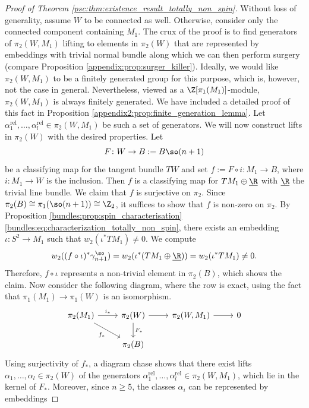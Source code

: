 \begin{proof}[Proof of Theorem \ref{psc:thm:existence_result_totally_non_spin}]
Without loss of generality, assume $W$ to be connected as well. Otherwise, consider only the connected component containing $M_1$. The crux of the proof is to find generators of $\pi_2(W,M_1)$ lifting to elements in $\pi_2(W)$ that are represented by embeddings with trivial normal bundle along which we can then perform surgery (compare Proposition \ref{appendix:prop:surger_killer}). Ideally, we would like $\pi_2(W,M_1)$ to be a finitely generated group for this purpose, which is, however, not the case in general. Nevertheless, viewed as a $\Z[\pi_1(M_1)]$-module, $\pi_2(W,M_1)$ is always finitely generated. We have included a detailed proof of this fact in Proposition \ref{appendix2:prop:finite_generation_lemma}. Let $\alpha_1^\mathrm{rel},\ldots, \alpha_l^\mathrm{rel} \in \pi_2(W,M_1)$ be such a set of generators. We will now construct lifts in $\pi_2(W)$ with the desired properties. 
Let
\[
F \colon W \to B := B\so(n+1)
\]
be a classifying map for the tangent bundle $TW$ and set $f := F \circ i \colon M_1 \to B$, where $i \colon M_1 \to W$ is the inclusion. Then $f$ is a classifying map for $TM_1 \oplus \underline{\R}$ with $\underline{\R}$ the trivial line bundle. We claim that $f$ is surjective on $\pi_2$. Since $\pi_2(B) \cong \pi_1(\so(n+1)) \cong \Z_2$, it suffices to show that $f$ is non-zero on $\pi_2$. By Proposition \ref{bundles:prop:spin_characterisation} \ref{bundles:eq:characterization_totally_non_spin}, there exists an embedding $\iota \colon S^2 \to M_1$ such that $w_2(\iota^\ast TM_1) \neq 0$. We compute 
\[
w_2((f \circ \iota)^\ast \gamma_{n+1}^\so) = w_2(\iota^\ast (TM_1 \oplus \underline{\R})) = w_2(\iota^\ast TM_1) \neq 0.
\]
Therefore, $f \circ \iota$ represents a non-trivial element in $\pi_2(B)$, which shows the claim. Now consider the following diagram, where the row is exact, using the fact that $\pi_1(M_1) \to \pi_1(W)$ is an isomorphism.
\[
\begin{tikzcd}
	{\pi_2(M_1)} & {\pi_2(W)} & {\pi_2(W,M_1)} & 0 \\ 
	& {\pi_2(B)}
	\arrow["{i_\ast}", from=1-1, to=1-2]
	\arrow["{f_\ast}"', from=1-1, to=2-2]
	\arrow[from=1-2, to=1-3]
	\arrow["{F_\ast}", from=1-2, to=2-2]
	\arrow[from=1-3, to=1-4]
\end{tikzcd}
\]
Using surjectivity of $f_\ast$, a diagram chase shows that there exist lifts $\alpha_1,\ldots, \alpha_l \in \pi_2(W)$ of the generators $\alpha_1^\mathrm{rel},\ldots, \alpha_l^\mathrm{rel} \in \pi_2(W,M_1)$, which lie in the kernel of $F_\ast$. Moreover, since $n \geq 5$, the classes $\alpha_i$ can be represented by embeddings 

\end{proof}

